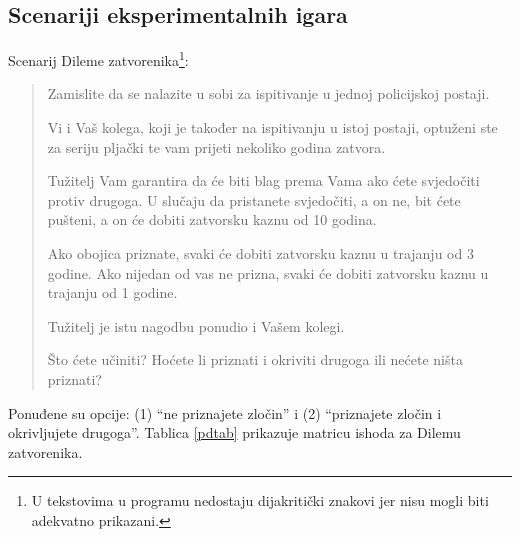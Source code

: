\documentclass[a4paper, 12pt]{report}
\begin{document}
\makeatletter
{}
\makeatother
\setcounter{table}{0}
\renewcommand{\thetable}{D\arabic{table}}
\setcounter{figure}{0}
\renewcommand{\thefigure}{D\arabic{figure}}
\begin{appendices}

\subsection{Scenariji eksperimentalnih igara}

Scenarij Dileme zatvorenika\footnote{U tekstovima u programu nedostaju dijakritički
    znakovi jer nisu mogli biti adekvatno prikazani.}: 
\begin{quote}
Zamislite da se nalazite u sobi za ispitivanje u jednoj policijskoj postaji.  

Vi i Vaš kolega, koji je također na ispitivanju u istoj postaji, optuženi ste
za seriju pljački te vam prijeti nekoliko godina zatvora. 

Tužitelj Vam garantira da će biti blag prema Vama ako ćete svjedočiti protiv
drugoga. U slučaju da pristanete svjedočiti, a on ne, bit ćete pušteni, a on će
dobiti zatvorsku kaznu od 10 godina.

Ako obojica priznate, svaki će dobiti zatvorsku kaznu u trajanju od 3 godine.
Ako nijedan od vas ne prizna, svaki će dobiti zatvorsku kaznu u trajanju od 1
godine.

Tužitelj je istu nagodbu ponudio i Vašem kolegi. 

Što ćete učiniti? Hoćete li priznati i okriviti drugoga ili nećete ništa priznati?
\end{quote}

Ponuđene su opcije: (1) \enquote{ne priznajete zločin} i (2) \enquote{priznajete
    zločin i okrivljujete drugoga}. Tablica \ref{pdtab} prikazuje matricu ishoda
za Dilemu zatvorenika. 


\end{appendices}
\end{document}
